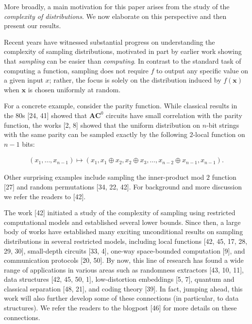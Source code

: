 More broadly, a main motivation for this paper arises from the study of the \emph{complexity of distributions}. We now elaborate on this perspective and then present our results.\par




Recent years have witnessed substantial progress on understanding the complexity of sampling distributions, motivated in part by earlier work showing that \emph{sampling} can be easier than \emph{computing}.
In contrast to the standard task of computing a function, sampling does not require $f$ to output any specific value on a given input $x$; rather, the focus is solely on the distribution induced by $f(\boldsymbol{x})$ when $\boldsymbol{x}$ is chosen uniformly at random.\par




For a concrete example, consider the parity function.
While classical results in the 80s [24, 41] showed that $\mathbf{AC}^{0}$ circuits have small correlation with the parity function, the works [2, 8] showed that the uniform distribution on $n$-bit strings with the same parity can be sampled exactly by the following $2$-local function on $n-1$ bits:\par


\[\begin{gathered}
(x_{1},\ldots,x_{n-1})\mapsto(x_{1},x_{1}\oplus x_{2},x_{2}\oplus x_{3},\ldots,x_{n-2}\oplus x_{n-1},x_{n-1}).
\end{gathered}\]


Other surprising examples include sampling the inner-product mod $2$ function [27] and random permutations [34, 22, 42].
For background and more discussion we refer the readers to [42].\par




The work [42] initiated a study of the complexity of sampling using restricted computational models and established several lower bounds.
Since then, a large body of works have established many exciting unconditional results on sampling distributions in several restricted models, including local functions [42, 45, 17, 28, 29, 30], small-depth circuits [33, 4], one-way space-bounded computation [9], and communication protocols [20, 50].
By now, this line of research has found a wide range of applications in various areas such as randomness extractors [43, 10, 11], data structures [42, 45, 50, 1], low-distortion embeddings [5, 7], quantum and classical separation [48, 21], and coding theory [39]. In fact, jumping ahead, this work will also further develop some of these connections (in particular, to data structures). We refer the readers to the blogpost [46] for more details on these connections.\par




